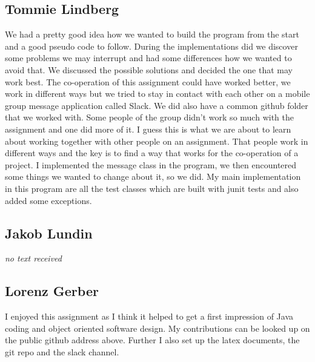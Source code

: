\documentclass[a4paper,11pt,twoside]{article}
\begin{document}
\subsection{Tommie Lindberg}
We had a pretty good idea how we wanted to build the program from the
start and a good pseudo code to follow. During the implementations did
we discover some problems we may interrupt and had some differences how
we wanted to avoid that. We discussed the possible solutions and
decided the one that may work best. 
The co-operation of this assignment could have worked better, we work
in different ways but we tried to stay in contact with each other on a
mobile group message application called Slack. We did also have a
common github folder that we worked with. Some people of the group
didn't work so much with the assignment and one did more of it. I
guess this is what we are about to learn about working together with
other people on an assignment. That people work in different ways and
the key is to find a way that works for the co-operation of a project.
I implemented the message class in the program, we then encountered
some things we wanted to change about it, so we did. My main
implementation in this program are all the test classes which are
built with junit tests and also added some exceptions.

\subsection{Jakob Lundin}
\textit{no text received}

\subsection{Lorenz Gerber}
I enjoyed this assignment as I think it helped to get a first
impression of Java coding and object oriented software design. 
My contributions can be looked up on the public github address
above. Further I also set up the latex documents, the git repo and the
slack channel.   


\end{document}
